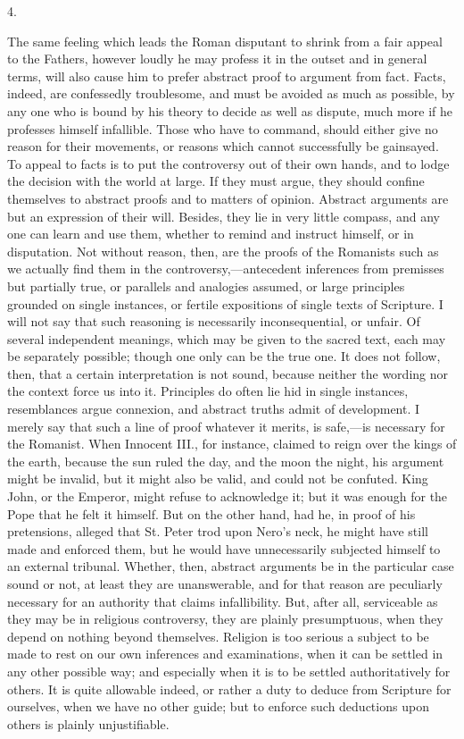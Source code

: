 4.

The same feeling which leads the Roman disputant to shrink from a
fair appeal to the Fathers, however loudly he may profess it in the
outset and in general terms, will also cause him to prefer abstract
proof to argument from fact. Facts, indeed, are confessedly
troublesome, and must be avoided as much as possible, by any one who
is bound by his theory to decide as well as dispute, much more if he
professes himself infallible. Those who have to command, should either
give no reason for their movements, or reasons which cannot
successfully be gainsayed. To appeal to facts is to put the
controversy out of their own hands, and to lodge the decision with the
world at large. If they must argue, they should confine themselves to
abstract proofs and to matters of opinion. Abstract arguments are but
an expression of their will. Besides, they lie in very little compass,
and any one can learn and use them, whether to remind and instruct
himself, or in disputation. Not without reason, then, are the proofs
of the Romanists such as we actually find them in the controversy,—antecedent
inferences from premisses but partially true, or parallels and
analogies assumed, or large principles grounded on single instances,
or fertile expositions of single texts of Scripture. I will not say
that such reasoning is necessarily inconsequential, or unfair. Of
several independent meanings, which may be given to the sacred text,
each may be separately possible; though one only can be the true one.
It does not follow, then, that a certain interpretation is not sound,
because neither the wording nor the context force us into it.
Principles do often lie hid in single instances, resemblances argue
connexion, and abstract truths admit of development. I merely say that
such a line of proof whatever it merits, is safe,—is necessary for
the Romanist. When Innocent III., for instance, claimed to reign
over the kings of the earth, because the sun ruled the day, and the
moon the night, his argument might be invalid, but it might also be
valid, and could not be confuted. King John, or the Emperor, might
refuse to acknowledge it; but it was enough for the Pope that he felt
it himself. But on the other hand, had he, in proof of his
pretensions, alleged that St. Peter trod upon Nero's neck, he might
have still made and enforced them, but he would have unnecessarily
subjected himself to an external tribunal. Whether, then, abstract
arguments be in the particular case sound or not, at least they are
unanswerable, and for that reason are peculiarly necessary for an
authority that claims infallibility. But, after all, serviceable as
they may be in religious controversy, they are plainly presumptuous,
when they depend on nothing beyond themselves. Religion is too serious
a subject to be made to rest on our own inferences and examinations,
when it can be settled in any other possible way; and especially when
it is to be settled authoritatively for others. It is quite allowable
indeed, or rather a duty to deduce from Scripture for ourselves, when
we have no other guide; but to enforce such deductions upon others is
plainly unjustifiable.

